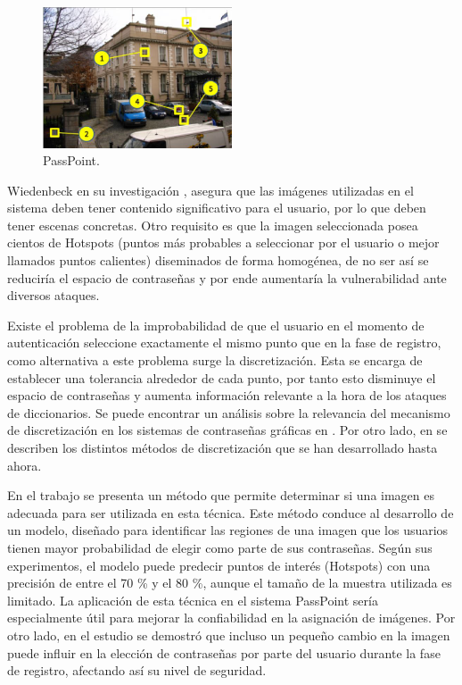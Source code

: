 \documentclass[12pt]{report}
\begin{document}
			\begin{figure}[ht]
		\centering
		\includegraphics[width=0.5\textwidth]{passpoint.png}
		\caption{PassPoint.}
		\label{fig:PassPoint}
	\end{figure}
	Wiedenbeck en su investigación \cite{1}, asegura que las imágenes utilizadas en el sistema deben tener contenido significativo para el usuario, por lo que deben tener escenas concretas. Otro requisito es que la imagen seleccionada posea cientos de Hotspots (puntos más probables a seleccionar por el usuario o mejor llamados puntos calientes) diseminados de forma homogénea, de no ser así se reduciría el espacio de contraseñas y por ende aumentaría la vulnerabilidad ante diversos ataques.
	 
	Existe el problema de la improbabilidad de que el usuario en el momento de autenticación  seleccione exactamente el mismo punto que en la fase de registro, como alternativa a este problema surge la discretización. Esta se encarga de establecer una tolerancia alrededor de cada punto, por tanto esto disminuye el espacio de contraseñas y aumenta información relevante a la hora de los ataques de diccionarios. Se puede encontrar un análisis sobre la relevancia del mecanismo de discretización en los sistemas de contraseñas gráficas en \cite{14,15,16}. Por otro lado, en \cite{14,15,16,17} se describen los distintos métodos de discretización que se han desarrollado hasta ahora.

	
	En el trabajo \cite{18} se presenta un método que permite determinar si una imagen es adecuada para ser utilizada en esta técnica. Este método conduce al desarrollo de un modelo, diseñado para identificar las regiones de una imagen que los usuarios tienen mayor probabilidad de elegir como parte de sus contraseñas. Según sus experimentos, el modelo puede predecir puntos de interés (Hotspots) con una precisión de entre el 70 \% y el 80 \%, aunque el tamaño de la muestra utilizada es limitado. La aplicación de esta técnica en el sistema PassPoint sería especialmente útil para mejorar la confiabilidad en la asignación de imágenes. Por otro lado, en el estudio \cite{19} se demostró que incluso un pequeño cambio en la imagen puede influir en la elección de contraseñas por parte del usuario durante la fase de registro, afectando así su nivel de seguridad.   
\end{document}
